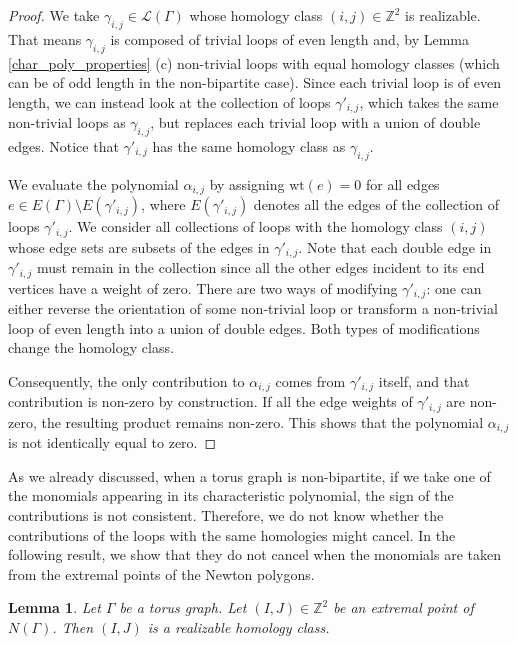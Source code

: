 \documentclass[12pt,a4paper]{article}
\newtheorem{lem}[thm]{Lemma}
\theoremstyle{definition}
\def\wt{\mathrm {wt}}
\begin{document}
\begin{proof}
    We take $\gamma_{i,j} \in \mathcal L(\Gamma)$ whose homology class $(i,j) \in \mathbb{Z}^2$ is realizable.
    That means $\gamma_{i,j}$ is composed of trivial loops of even length and, by Lemma \ref{char_poly_properties} (c) non-trivial loops with equal homology classes (which can be of odd length in the non-bipartite case). Since each trivial loop is of even length, we can instead look at the collection of loops $\gamma'_{i,j}$, which takes the same non-trivial loops as $\gamma_{i,j}$, but replaces each trivial loop with a union of double edges. Notice that $\gamma'_{i,j}$ has the same homology class as $\gamma_{i,j}$.
    
    We evaluate the polynomial $\alpha_{i,j}$ by assigning $\wt(e) = 0$ for all edges $e \in E(\Gamma) \setminus E(\gamma'_{i,j})$, where $E(\gamma'_{i,j})$ denotes all the edges of the collection of loops $\gamma'_{i,j}$. We consider all collections of loops with the homology class $(i, j)$ whose edge sets are subsets of the edges in $\gamma'_{i,j}$. Note that each double edge in $\gamma'_{i,j}$ must remain in the collection since all the other edges incident to its end vertices have a weight of zero. There are two ways of modifying $\gamma'_{i,j}$: one can either reverse the orientation of some non-trivial loop or transform a non-trivial loop of even length into a union of double edges. Both types of modifications change the homology class.
    
    Consequently, the only contribution to $\alpha_{i,j}$ comes from $\gamma'_{i,j}$ itself, and that contribution is non-zero by construction. If all the edge weights of $\gamma'_{i,j}$ are non-zero, the resulting product remains non-zero. This shows that the polynomial $\alpha_{i,j}$ is not identically equal to zero.
\end{proof}

As we already discussed, when a torus graph is non-bipartite, if we take one of the monomials appearing in its characteristic polynomial, the sign of the contributions is not consistent. Therefore, we do not know whether the contributions of the loops with the same homologies might cancel. In the following result, we show that they do not cancel when the monomials are taken from the extremal points of the Newton polygons.

\begin{lem} \label{ext_homology}
    Let $\Gamma$ be a torus graph. Let $(I,J) \in \mathbb{Z}^2$ be an extremal point of $N(\Gamma)$. Then $(I,J)$ is a realizable homology class.
\end{lem}
\end{document}
